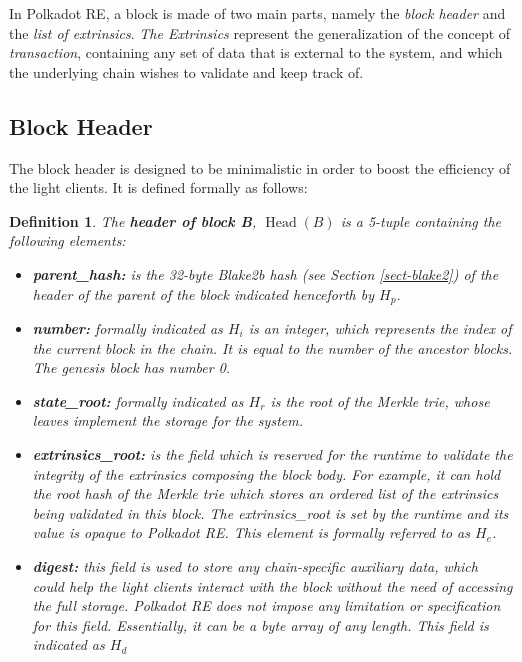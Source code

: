 \documentclass{article}
\newcommand{\tmem}[1]{{\em #1\/}}
\newcommand{\tmop}[1]{\ensuremath{\operatorname{#1}}}
\newcommand{\tmsamp}[1]{\textsf{#1}}
\newcommand{\tmstrong}[1]{\textbf{#1}}
\newcommand{\tmtextbf}[1]{{\bfseries{#1}}}
\newcommand{\tmtextit}[1]{{\itshape{#1}}}
\newcommand{\tmtextsf}[1]{{\sffamily{#1}}}
\newtheorem{definition}{Definition}
\providecommand{\tmem}[1]{\tmtextit{#1}}
\providecommand{\tmop}[1]{\ensuremath{\mathrm{#1}}}
\providecommand{\tmsamp}[1]{\tmtextsf{#1}}
\providecommand{\tmstrong}[1]{\tmtextbf{#1}}
\providecommand{\tmtextbf}[1]{\tmtextbf{#1}}
\providecommand{\tmtextit}[1]{\tmtextit{#1}}
\newtheorem{definition}{Definition}
\begin{document}
In Polkadot RE, a block is made of two main parts, namely the \tmtextit{block
header} and the \tmtextit{list of extrinsics}. {\tmem{The Extrinsics}}
represent the generalization of the concept of {\tmem{transaction}},
containing any set of data that is external to the system, and which the
underlying chain wishes to validate and keep track of.

\subsection{Block Header}\label{block}

The block header is designed to be minimalistic in order to boost the
efficiency of the light clients. It is defined formally as follows:

\begin{definition}
  \label{defn-block-header}The {\tmstrong{header of block B}},
  {\tmstrong{$\tmop{Head} (B)$}} is a 5-tuple containing the following
  elements:
  \begin{itemize}
    \item \tmtextbf{{\tmsamp{parent\_hash:}}} is the 32-byte Blake2b hash (see
    Section \ref{sect-blake2}) of the header of the parent of the block
    indicated henceforth by \tmtextbf{$H_p$}.
    
    \item {\tmstrong{{\tmsamp{number:}}}} formally indicated as
    {\tmstrong{$H_i$}} is an integer, which represents the index of the
    current block in the chain. It is equal to the number of the ancestor
    blocks. The genesis block has number 0.
    
    \item {\tmstrong{{\tmsamp{state\_root:}}}} formally indicated as
    {\tmstrong{$H_r$}} is the root of the Merkle trie, whose leaves implement
    the storage for the system.
    
    \item {\tmstrong{{\tmsamp{extrinsics\_root:}}}} is the field which is
    reserved for the runtime to validate the integrity of the extrinsics
    composing the block body. For example, it can hold the root hash of the
    Merkle trie which stores an ordered list of the extrinsics being validated
    in this block. The {\tmsamp{extrinsics\_root}} is set by the runtime and
    its value is opaque to Polkadot RE. This element is formally referred to
    as {\tmstrong{$H_e$}}.
    
    \item {\tmstrong{{\tmsamp{digest:}}}} this field is used to store any
    chain-specific auxiliary data, which could help the light clients interact
    with the block without the need of accessing the full storage. Polkadot RE
    does not impose any limitation or specification for this field.
    Essentially, it can be a byte array of any length. This field is indicated
    as {\tmstrong{$H_d$}}
  \end{itemize}
\end{definition}
\end{document}
